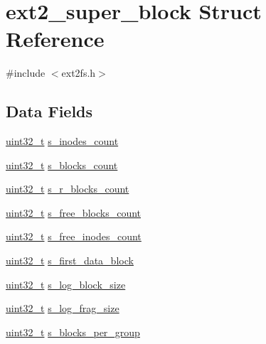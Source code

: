 \hypertarget{structext2__super__block}{\section{ext2\-\_\-super\-\_\-block \-Struct \-Reference}
\label{structext2__super__block}
}


{\ttfamily \#include $<$ext2fs.\-h$>$}

\subsection*{\-Data \-Fields}
\begin{DoxyCompactItemize}
\item 
\hyperlink{types_8h_a435d1572bf3f880d55459d9805097f62}{uint32\-\_\-t} \hyperlink{structext2__super__block_a2ea20f821c0ddc19b0adc7d1b8d0685d}{s\-\_\-inodes\-\_\-count}
\item 
\hyperlink{types_8h_a435d1572bf3f880d55459d9805097f62}{uint32\-\_\-t} \hyperlink{structext2__super__block_a3878ffaff13c625cce6b825ecb797547}{s\-\_\-blocks\-\_\-count}
\item 
\hyperlink{types_8h_a435d1572bf3f880d55459d9805097f62}{uint32\-\_\-t} \hyperlink{structext2__super__block_a660db33fc94622167793c6b080c515e4}{s\-\_\-r\-\_\-blocks\-\_\-count}
\item 
\hyperlink{types_8h_a435d1572bf3f880d55459d9805097f62}{uint32\-\_\-t} \hyperlink{structext2__super__block_a005160872a0474cdc9be97da00b81b84}{s\-\_\-free\-\_\-blocks\-\_\-count}
\item 
\hyperlink{types_8h_a435d1572bf3f880d55459d9805097f62}{uint32\-\_\-t} \hyperlink{structext2__super__block_aeefbe6028c7e1554805b033287de0097}{s\-\_\-free\-\_\-inodes\-\_\-count}
\item 
\hyperlink{types_8h_a435d1572bf3f880d55459d9805097f62}{uint32\-\_\-t} \hyperlink{structext2__super__block_ab7c5dfba6eafbb1974f7628d4ae32601}{s\-\_\-first\-\_\-data\-\_\-block}
\item 
\hyperlink{types_8h_a435d1572bf3f880d55459d9805097f62}{uint32\-\_\-t} \hyperlink{structext2__super__block_a34965ad64787db6bf0893e000b19f608}{s\-\_\-log\-\_\-block\-\_\-size}
\item 
\hyperlink{types_8h_a435d1572bf3f880d55459d9805097f62}{uint32\-\_\-t} \hyperlink{structext2__super__block_a441780f5356cad879e465bb23d5c0659}{s\-\_\-log\-\_\-frag\-\_\-size}
\item 
\hyperlink{types_8h_a435d1572bf3f880d55459d9805097f62}{uint32\-\_\-t} \hyperlink{structext2__super__block_a037ab0266050cd0d0026c5da1fda3ab1}{s\-\_\-blocks\-\_\-per\-\_\-group}

\end{DoxyCompactItemize}
